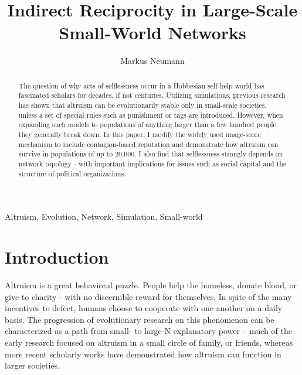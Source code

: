 \documentclass{JASSS}
\title{Indirect Reciprocity in Large-Scale Small-World Networks}
\author[1]{Markus Neumann}
\affil[1]{Department of Political Science, The Pennsylvania State University, University Park, PA 16802, USA.}
\begin{document}
\maketitle 



\begin{abstract}
The question of why acts of selflessness occur in a Hobbesian self-help world has fascinated scholars for decades, if not centuries. Utilizing simulations, previous research has shown that altruism can be evolutionarily stable only in small-scale societies, unless a set of special rules such as punishment or tags are introduced. However, when expanding such models to populations of anything larger than a few hundred people, they generally break down. In this paper, I modify the widely used image-score mechanism to include contagion-based reputation and demonstrate how altruism can survive in populations of up to 20,000. I also find that selflessness strongly depends on network topology - with important implications for issues such as social capital and the structure of political organizations.
\end{abstract}

\begin{keywords}
Altruism, Evolution, Network, Simulation, Small-world
\end{keywords}

\parano{}



\section{Introduction}
Altruism is a great behavioral puzzle. People help the homeless, donate blood, or give to charity - with no discernible reward for themselves. In spite of the many incentives to defect, humans choose to cooperate with one another on a daily basis. The progression of evolutionary research on this phenomenon can be characterized as a path from small- to large-N explanatory power -- much of the early research focused on altruism in a small circle of family, or friends, whereas more recent scholarly works have demonstrated how altruism can function in larger societies.
\end{document}
